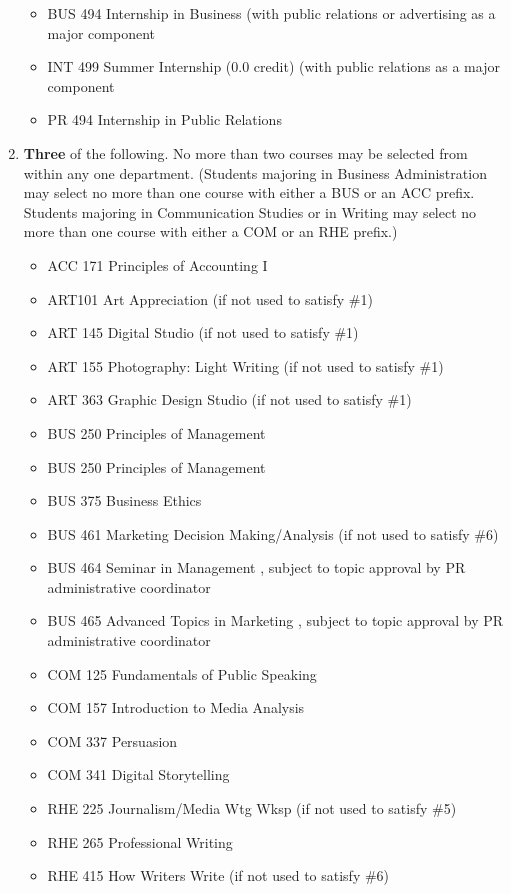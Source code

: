 \documentclass[
  letterpaper,
]{scrbook}
\providecommand{\tightlist}{%
  \setlength{\itemsep}{0pt}\setlength{\parskip}{0pt}}
\begin{document}
\begin{enumerate}
  \begin{itemize}
  \tightlist
  \item
    BUS 494 Internship in Business (with public relations or advertising
    as a major component
  \item
    INT 499 Summer Internship (0.0 credit) (with public relations as a
    major component
  \item
    PR 494 Internship in Public Relations
  \end{itemize}
\item
  \textbf{Three} of the following. No more than two courses may be
  selected from within any one department. (Students majoring in
  Business Administration may select no more than one course with either
  a BUS or an ACC prefix. Students majoring in Communication Studies or
  in Writing may select no more than one course with either a COM or an
  RHE prefix.)

  \begin{itemize}
  \tightlist
  \item
    ACC 171 Principles of Accounting I
  \item
    ART101 Art Appreciation (if not used to satisfy \#1)
  \item
    ART 145 Digital Studio (if not used to satisfy \#1)
  \item
    ART 155 Photography: Light Writing (if not used to satisfy \#1)
  \item
    ART 363 Graphic Design Studio (if not used to satisfy \#1)
  \item
    BUS 250 Principles of Management
  \item
    BUS 250 Principles of Management
  \item
    BUS 375 Business Ethics
  \item
    BUS 461 Marketing Decision Making/Analysis (if not used to satisfy
    \#6)
  \item
    BUS 464 Seminar in Management , subject to topic approval by PR
    administrative coordinator
  \item
    BUS 465 Advanced Topics in Marketing , subject to topic approval by
    PR administrative coordinator
  \item
    COM 125 Fundamentals of Public Speaking
  \item
    COM 157 Introduction to Media Analysis
  \item
    COM 337 Persuasion
  \item
    COM 341 Digital Storytelling
  \item
    RHE 225 Journalism/Media Wtg Wksp (if not used to satisfy \#5)
  \item
    RHE 265 Professional Writing
  \item
    RHE 415 How Writers Write (if not used to satisfy \#6)
  \end{itemize}
\end{enumerate}
\end{document}
